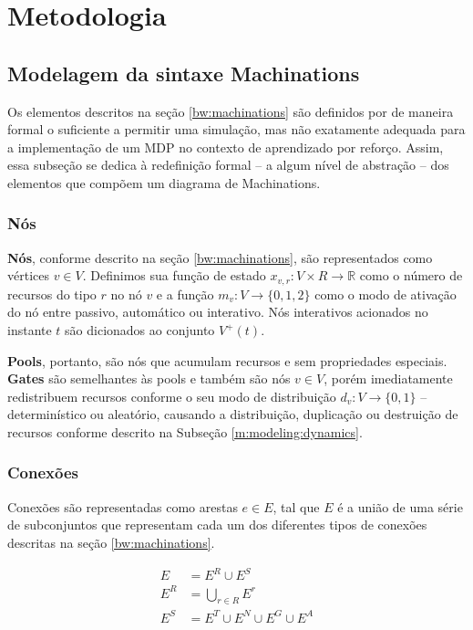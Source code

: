 \documentclass[10pt,a4paper]{article}
\begin{document}
\section{Metodologia}
\label{m}

\subsection{Modelagem da sintaxe Machinations}
\label{m:modeling}
Os elementos descritos na seção \ref{bw:machinations} são definidos por \citeauthor{machinations} de maneira formal o suficiente a permitir uma simulação, mas não exatamente adequada para a implementação de um MDP no contexto de aprendizado por reforço. Assim, essa subseção se dedica à redefinição formal -- a algum nível de abstração -- dos elementos que compõem um diagrama de Machinations.

\subsubsection{Nós}
\textbf{Nós}, conforme descrito na seção \ref{bw:machinations}, são representados como vértices $v \in V$. Definimos sua função de estado $x_{v,r}: V \times R \rightarrow \mathbb{R}$ como o número de recursos do tipo $r$ no nó $v$ e a função $m_{v}: V \rightarrow \{0,1,2\}$ como o modo de ativação do nó entre passivo, automático ou interativo. Nós interativos acionados no instante $t$ são dicionados ao conjunto $V^+(t)$.

\textbf{Pools}, portanto, são nós que acumulam recursos e sem propriedades especiais. \textbf{Gates} são semelhantes às pools e também são nós $v \in V$, porém imediatamente redistribuem recursos conforme o seu modo de distribuição $d_v : V \rightarrow \{0,1\}$ -- determinístico ou aleatório, causando a distribuição, duplicação ou destruição de recursos conforme descrito na Subseção \ref{m:modeling:dynamics}.

\subsubsection{Conexões}
\label{m:modeling:connections}
Conexões são representadas como arestas $e \in E$, tal que $E$ é a união de uma série de subconjuntos que representam cada um dos diferentes tipos de conexões descritas na seção \ref{bw:machinations}.

\begin{align*}
    E &= E^R \cup E^S\\
    E^R &= \bigcup_{r \in R} E^r\\
    E^S &= E^{T} \cup E^{N} \cup E^{G} \cup E^{A}
\end{align*}
\end{document}

